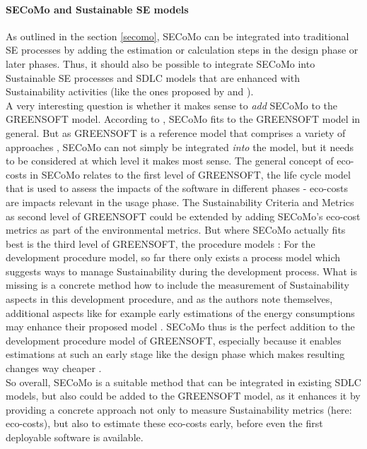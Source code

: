 \documentclass[oribibl]{llncs}
\begin{document}
\paragraph{SECoMo and Sustainable SE models}
As outlined in the section \ref{secomo}, SECoMo can be integrated into traditional SE processes by adding the estimation or calculation steps in the design phase or later phases. Thus, it should also be possible to integrate SECoMo into Sustainable SE processes and SDLC models that are enhanced with Sustainability activities (like the ones proposed by \cite{agarwal_sustainable_2012} and \cite{shenoy_green_2011}).\\
A very interesting question is whether it makes sense to \textit{add} SECoMo to the GREENSOFT model. According to \cite{schulze_cost_2016}, SECoMo fits to the GREENSOFT model in general. But as GREENSOFT is a reference model that comprises a variety of approaches \cite{naumann_greensoft_2011}, SECoMo can not simply be integrated \textit{into} the model, but it needs to be considered at which level it makes most sense. The general concept of eco-costs in SECoMo relates to the first level of GREENSOFT, the life cycle model that is used to assess the impacts of the software in different phases \cite{naumann_greensoft_2011} - eco-costs are impacts relevant in the usage phase. The Sustainability Criteria and Metrics as second level of GREENSOFT could be extended by adding SECoMo's eco-cost metrics as part of the environmental metrics. But where SECoMo actually fits best is the third level of GREENSOFT, the procedure models \cite{naumann_greensoft_2011}: For the development procedure model, so far there only exists a process model which suggests ways to manage Sustainability during the development process. What is missing is a concrete method how to include the measurement of Sustainability aspects in this development procedure, and as the authors note themselves, additional aspects like for example early estimations of the energy consumptions may enhance their proposed model \cite{naumann_greensoft_2011}. %
SECoMo thus is the perfect addition to the development procedure model of GREENSOFT, especially because it enables estimations at such an early stage like the design phase which makes resulting changes way cheaper \cite{schulze_cost_2016}.\\
So overall, SECoMo is a suitable method that can be integrated in existing SDLC models, but also could be added to the GREENSOFT model, as it enhances it by providing a concrete approach not only to measure Sustainability metrics (here: eco-costs), but also to estimate these eco-costs early, before even the first deployable software is available.
\end{document}
